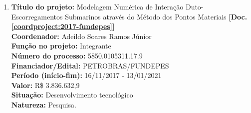 \documentclass[a4paper,oneside,10pt]{article}
\begin{document}
\begin{enumerate}
        
     
 \item \textbf{Título do projeto:} Modelagem Numérica de Interação Duto-Escorregamentos Submarinos através do Método dos Pontos Materiais \textbf{[Doc. \ref{coordproject:2017-fundepes}]}\\
      \textbf{Coordenador:} Adeildo Soares Ramos Júnior\\
      \textbf{Função no projeto:} Integrante\\
      \textbf{Número do processo:} 5850.0105311.17.9 \\
      \textbf{Financiador/Edital:} PETROBRAS/FUNDEPES\\
      \textbf{Período (início-fim):} 16/11/2017 - 13/01/2021\\
      \textbf{Valor:} R\$ 3.836.632,9 \\
      \textbf{Situação:} Desenvolvimento tecnológico\\
      \textbf{Natureza:} Pesquisa.
       
\end{enumerate}
\end{document}
